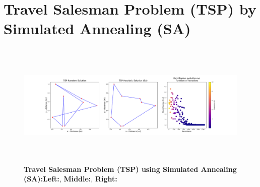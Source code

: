 \section{Travel Salesman Problem (TSP) by Simulated Annealing (SA)}
\begin{figure}[H]
\centerline{\includegraphics[width=20cm, height=6cm]{Figures/TSP_SA.pdf}}
    \caption{\textbf{Travel Salesman Problem (TSP) using Simulated Annealing (SA):}\textbf{Left:}, \textbf{Middle:}, \textbf{Right:}}
    \label{fig:TSP_SA}
\end{figure}
